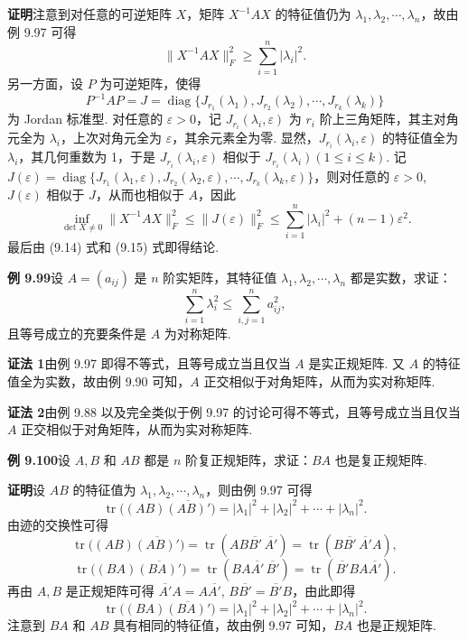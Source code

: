 \documentclass[UTF8, 12pt, fontset=fandol, oneside]{ctexart}
\begin{document}
\noindent\textbf{证明}\quad 注意到对任意的可逆矩阵 $X$，矩阵 $X^{-1}AX$ 的特征值仍为 $\lambda_1,\lambda_2,\cdots,\lambda_n$，故由例 9.97 可得
\begin{equation}
\|X^{-1}AX\|_F^2\ge\sum_{i=1}^n|\lambda_i|^2.
\tag{9.14}
\end{equation}
另一方面，设 $P$ 为可逆矩阵，使得
\[
P^{-1}AP=J=\operatorname{diag}\{J_{r_1}(\lambda_1),J_{r_2}(\lambda_2),\cdots,J_{r_k}(\lambda_k)\}
\]
为 Jordan 标准型. 对任意的 $\varepsilon>0$，记 $J_{r_i}(\lambda_i,\varepsilon)$ 为 $r_i$ 阶上三角矩阵，其主对角元全为 $\lambda_i$，上次对角元全为 $\varepsilon$，其余元素全为零. 显然，$J_{r_i}(\lambda_i,\varepsilon)$ 的特征值全为 $\lambda_i$，其几何重数为 1，于是 $J_{r_i}(\lambda_i,\varepsilon)$ 相似于 $J_{r_i}(\lambda_i)(1\le i\le k)$. 记 $J(\varepsilon)=\operatorname{diag}\{J_{r_1}(\lambda_1,\varepsilon),J_{r_2}(\lambda_2,\varepsilon),\cdots,J_{r_k}(\lambda_k,\varepsilon)\}$，则对任意的 $\varepsilon>0$, $J(\varepsilon)$ 相似于 $J$，从而也相似于 $A$，因此
\begin{equation}
\inf_{\det X\ne0}\|X^{-1}AX\|_F^2\le \|J(\varepsilon)\|_F^2\le\sum_{i=1}^n|\lambda_i|^2+(n-1)\varepsilon^2.
\tag{9.15}
\end{equation}
最后由 (9.14) 式和 (9.15) 式即得结论.

\noindent\textbf{例 9.99}\quad 设 $A=(a_{ij})$ 是 $n$ 阶实矩阵，其特征值 $\lambda_1,\lambda_2,\cdots,\lambda_n$ 都是实数，求证：
\[
\sum_{i=1}^n\lambda_i^2\le\sum_{i,j=1}^na_{ij}^2,
\]
且等号成立的充要条件是 $A$ 为对称矩阵.

\noindent\textbf{证法 1}\quad 由例 9.97 即得不等式，且等号成立当且仅当 $A$ 是实正规矩阵. 又 $A$ 的特征值全为实数，故由例 9.90 可知，$A$ 正交相似于对角矩阵，从而为实对称矩阵.

\noindent\textbf{证法 2}\quad 由例 9.88 以及完全类似于例 9.97 的讨论可得不等式，且等号成立当且仅当 $A$ 正交相似于对角矩阵，从而为实对称矩阵.

\noindent\textbf{例 9.100}\quad 设 $A,B$ 和 $AB$ 都是 $n$ 阶复正规矩阵，求证：$BA$ 也是复正规矩阵.

\noindent\textbf{证明}\quad 设 $AB$ 的特征值为 $\lambda_1,\lambda_2,\cdots,\lambda_n$，则由例 9.97 可得
\[
\operatorname{tr}\bigl((AB)\overline{(AB)'}\bigr)=|\lambda_1|^2+|\lambda_2|^2+\cdots+|\lambda_n|^2.
\]
由迹的交换性可得
\[
\operatorname{tr}\bigl((AB)\overline{(AB)'}\bigr)=\operatorname{tr}(AB\overline{B'}\,\overline{A'})=\operatorname{tr}(B\overline{B'}\,\overline{A'}A),
\]
\[
\operatorname{tr}\bigl((BA)\overline{(BA)'}\bigr)=\operatorname{tr}(BA\overline{A'}\,\overline{B'})=\operatorname{tr}(\overline{B'}BA\overline{A'}).
\]
再由 $A,B$ 是正规矩阵可得 $\overline{A'}A=A\overline{A'}$, $B\overline{B'}=\overline{B'}B$，由此即得
\[
\operatorname{tr}\bigl((BA)\overline{(BA)'}\bigr)=|\lambda_1|^2+|\lambda_2|^2+\cdots+|\lambda_n|^2.
\]
注意到 $BA$ 和 $AB$ 具有相同的特征值，故由例 9.97 可知，$BA$ 也是正规矩阵.
\end{document}
